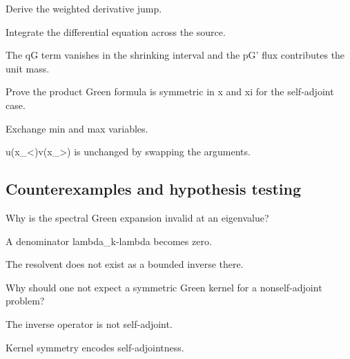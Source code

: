 \begin{exercise}\label{exr:iii26-expand-08}
Derive the weighted derivative jump.
\end{exercise}
\begin{hint}
Integrate the differential equation across the source.
\end{hint}
\begin{solution}
The qG term vanishes in the shrinking interval and the pG' flux contributes the unit mass.
\end{solution}

\begin{exercise}[Symmetry]\label{exr:iii26-expand-09}
Prove the product Green formula is symmetric in x and xi for the self-adjoint case.
\end{exercise}
\begin{hint}
Exchange min and max variables.
\end{hint}
\begin{solution}
u(x\_<)v(x\_>) is unchanged by swapping the arguments.
\end{solution}

\subsection*{Counterexamples and hypothesis testing}

\begin{exercise}\label{exr:iii26-expand-10}
Why is the spectral Green expansion invalid at an eigenvalue?
\end{exercise}
\begin{hint}
A denominator lambda\_k-lambda becomes zero.
\end{hint}
\begin{solution}
The resolvent does not exist as a bounded inverse there.
\end{solution}

\begin{exercise}\label{exr:iii26-expand-11}
Why should one not expect a symmetric Green kernel for a nonself-adjoint problem?
\end{exercise}
\begin{hint}
The inverse operator is not self-adjoint.
\end{hint}
\begin{solution}
Kernel symmetry encodes self-adjointness.
\end{solution}

